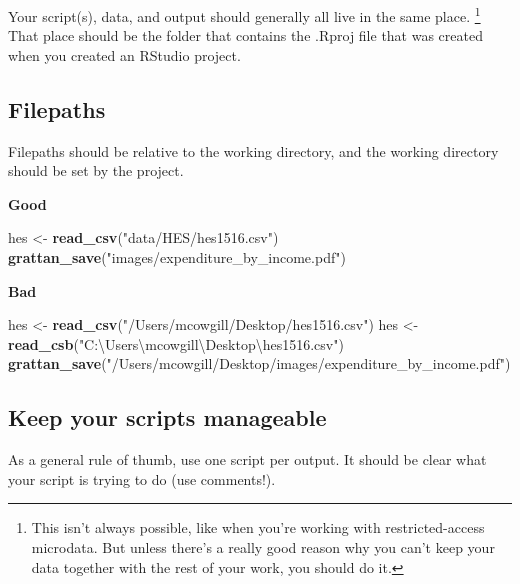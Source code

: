 \documentclass[]{book}
\newenvironment{Shaded}{\begin{snugshade}}{\end{snugshade}}
\newcommand{\KeywordTok}[1]{\textcolor[rgb]{0.13,0.29,0.53}{\textbf{#1}}}
\newcommand{\NormalTok}[1]{#1}
\newcommand{\StringTok}[1]{\textcolor[rgb]{0.31,0.60,0.02}{#1}}
\let\rmarkdownfootnote\footnote%
\def\footnote{\protect\rmarkdownfootnote}
\begin{document}
Your script(s), data, and output should generally all live in the same place. \footnote{This isn't always possible, like when you're working with restricted-access microdata. But unless there's a really good reason why you can't keep your data together with the rest of your work, you should do it.} That place should be the folder that contains the .Rproj file that was created when you created an RStudio project.

\hypertarget{filepaths}{%
\subsection{Filepaths}\label{filepaths}}

Filepaths should be relative to the working directory, and the working directory should be set by the project.

\textbf{Good}

\begin{Shaded}
\begin{Highlighting}[]
\NormalTok{hes <-}\StringTok{ }\KeywordTok{read_csv}\NormalTok{(}\StringTok{"data/HES/hes1516.csv"}\NormalTok{)}
\KeywordTok{grattan_save}\NormalTok{(}\StringTok{"images/expenditure_by_income.pdf"}\NormalTok{)}
\end{Highlighting}
\end{Shaded}

\textbf{Bad}

\begin{Shaded}
\begin{Highlighting}[]
\NormalTok{hes <-}\StringTok{ }\KeywordTok{read_csv}\NormalTok{(}\StringTok{"/Users/mcowgill/Desktop/hes1516.csv"}\NormalTok{)}
\NormalTok{hes <-}\StringTok{ }\KeywordTok{read_csb}\NormalTok{(}\StringTok{"C:\textbackslash{}Users\textbackslash{}mcowgill\textbackslash{}Desktop\textbackslash{}hes1516.csv"}\NormalTok{)}
\KeywordTok{grattan_save}\NormalTok{(}\StringTok{"/Users/mcowgill/Desktop/images/expenditure_by_income.pdf"}\NormalTok{)}
\end{Highlighting}
\end{Shaded}

\hypertarget{keep-your-scripts-manageable}{%
\subsection{Keep your scripts manageable}\label{keep-your-scripts-manageable}}

As a general rule of thumb, use one script per output. It should be clear what your script is trying to do (use comments!).
\end{document}
